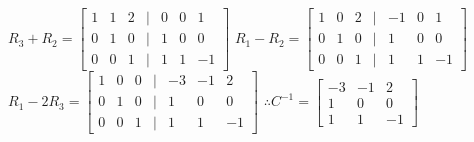 \documentclass[a4paper]{article}
\begin{document}
$R_3 + R_2 = \begin{bmatrix}
1&1&2&|&0&0&1\\
0&1&0&|&1&0&0\\
0&0&1&|&1&1&-1
\end{bmatrix}$ $R_1 - R_2 = \begin{bmatrix}
1&0&2&|&-1&0&1\\
0&1&0&|&1&0&0\\
0&0&1&|&1&1&-1
\end{bmatrix}$\\
$R_1 - 2R_3 = \begin{bmatrix}
1&0&0&|&-3&-1&2\\
0&1&0&|&1&0&0\\
0&0&1&|&1&1&-1
\end{bmatrix}$ $\therefore C^{-1} = \begin{bmatrix}
-3&-1&2\\
1&0&0\\
1&1&-1
\end{bmatrix}$\\
\end{document}
